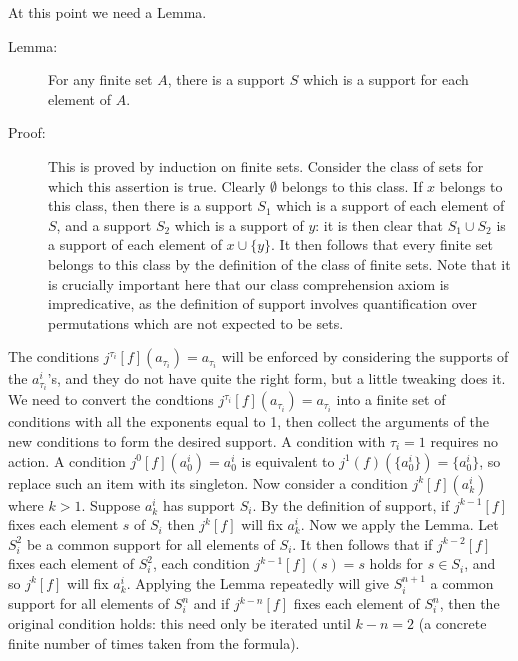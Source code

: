 \documentclass{article}
\begin{document}
\begin{description}
\begin{description}
At this point we need a Lemma.

\begin{description}

\item[Lemma:]  For any finite set $A$, there is a support $S$ which is a support for each element of $A$.

\item[Proof:]  This is proved by induction on finite sets.  Consider the class of sets for which this assertion is true.  Clearly $\emptyset$ belongs to this class.  If $x$ belongs to this class, then there is a support $S_1$ which is a support of each element of $S$, and a support $S_2$ which is a support of $y$:  it is then clear that $S_1 \cup S_2$ is a support of each element of $x \cup \{y\}$.  It then follows that every finite set belongs to this class by the definition of the class of finite sets.  Note that it is crucially important here that our class comprehension axiom is impredicative, as the definition of support involves quantification over permutations which are not expected to be sets.

\end{description}

The conditions $j^{\tau_i}[f](a_{\tau_i})=a_{\tau_i}$  will be enforced by considering the supports of the $a^i_{\tau_i}$'s, and they do not have quite the right form, but a little tweaking does it.
We need to convert the condtions $j^{\tau_i}[f](a_{\tau_i})=a_{\tau_i}$ into a finite set of conditions with all the exponents equal to 1, then
collect the arguments of the new conditions to form the desired support. A condition with $\tau_i = 1$ requires no action.  A condition
$j^0[f](a^i_0) = a^i_0$ is equivalent to $j^1(f)(\{a^i_0\}) = \{a^i_0\}$, so replace such an item with its singleton.  Now consider a condition
$j^k[f](a^i_k)$ where $k>1$.  Suppose $a^i_k$ has support $S_i$.  By the definition of support, if $j^{k-1}[f]$ fixes each element $s$ of $S_i$ then
$j^k[f]$ will fix $a^i_k$.  Now we apply the Lemma.  Let $S^2_i$ be a common support for all elements of $S_i$.  It then follows that
if $j^{k-2}[f]$ fixes each element of  $S^2_i$, each condition  $j^{k-1}[f](s) = s$ holds for $s \in S_i$, and so $j^k[f]$ will fix $a^i_k$.  Applying
the Lemma repeatedly will give $S^{n+1}_i$ a common support for all elements of $S^n_i$ and if $j^{k-n}[f]$ fixes each element of  $S^n_i$, then the original condition holds:  this need only be iterated until $k-n=2$ (a concrete finite number of times taken from the formula).


\end{description}
\end{description}
\end{document}
